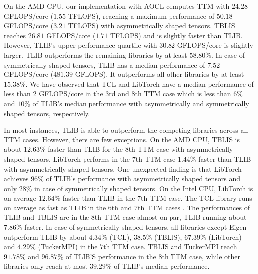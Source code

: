 On the AMD CPU, our implementation with AOCL computes TTM with $24.28$ GFLOPS/core ($1.55$ TFLOPS), reaching a maximum performance of $50.18$ GFLOPS/core ($3.21$ TFLOPS) with asymmetrically shaped tensors.
TBLIS reaches $26.81$ GFLOPS/core ($1.71$ TFLOPS) and is slightly faster than TLIB. 
However, TLIB's upper performance quartile with $30.82$ GFLOPS/core is slightly larger.
TLIB outperforms the remaining libraries by at least $58.80$\%.
In case of symmetrically shaped tensors, TLIB has a median performance of $7.52$ GFLOPS/core ($481.39$ GFLOPS).
It outperforms all other libraries by at least $15.38$\%.
We have observed that TCL and LibTorch have a median performance of less than $2$ GFLOPS/core in the $3$rd and $8$th TTM case which is less than $6$\% and $10$\% of TLIB's median performance with asymmetrically and symmetrically shaped tensors, respectively.

In most instances, TLIB is able to outperform the competing libraries across all TTM cases.
However, there are few exceptions.
On the AMD CPU, TBLIS is about $12.63$\% faster than TLIB for the $8$th TTM case with asymmetrically shaped tensors.
LibTorch performs in the $7$th TTM case $1.44$\% faster than TLIB with asymmetrically shaped tensors.
One unexpected finding is that LibTorch achieves $96$\% of TLIB's performance with asymmetrically shaped tensors and only $28$\% in case of symmetrically shaped tensors.
On the Intel CPU, LibTorch is on average $12.64$\% faster than TLIB in the $7$th TTM case.
The TCL library runs on average as fast as TLIB in the $6$th and $7$th TTM cases .
The performances of TLIB and TBLIS are in the $8$th TTM case almost on par, TLIB running about $7.86$\% faster.
In case of symmetrically shaped tensors, all libraries except Eigen outperform TLIB by about $4.34$\% (TCL), $38.5$\% (TBLIS), $67.39$\% (LibTorch) and $4.29$\% (TuckerMPI) in the $7$th TTM case.
TBLIS and TuckerMPI reach $91.78$\% and $96.87$\% of TLIB'S performance in the $8$th TTM case, while other libraries only reach at most $39.29$\% of TLIB's median performance.




